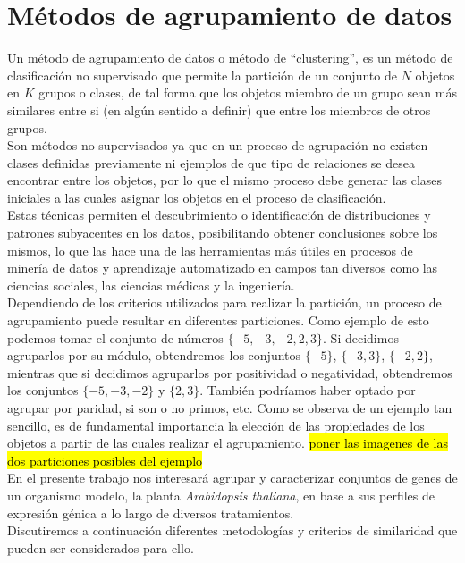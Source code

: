 \chapter{Métodos de agrupamiento de datos}
Un método de agrupamiento de datos o método de ``clustering'', es un método de clasificación no supervisado que permite la partición de un conjunto de $N$ objetos en $K$ grupos o clases, de tal forma que los objetos miembro de un grupo sean más similares entre si (en algún sentido a definir) que entre los miembros de otros grupos.\\
Son métodos no supervisados ya que en un proceso de agrupación no existen clases definidas previamente ni ejemplos de que tipo de relaciones se desea encontrar entre los objetos, por lo que el mismo proceso debe generar las clases iniciales a las cuales asignar los objetos en el proceso de clasificación.\\
Estas técnicas permiten el descubrimiento o identificación de distribuciones y patrones subyacentes en los datos, posibilitando obtener conclusiones sobre los mismos, lo que las hace una de las herramientas más útiles en procesos de minería de datos y aprendizaje automatizado en campos tan diversos como las ciencias sociales, las ciencias médicas y la ingeniería.\\
Dependiendo de los criterios utilizados para realizar la partición, un proceso de agrupamiento puede resultar en diferentes particiones. Como ejemplo de esto podemos tomar el conjunto de números $\{-5, -3, -2, 2, 3\}$. Si decidimos agruparlos por su módulo, obtendremos los conjuntos $\{-5\}$, $\{-3, 3\}$, $\{-2, 2\}$, mientras que si decidimos agruparlos por positividad o negatividad, obtendremos los conjuntos $\{-5, -3, -2\}$ y $\{2, 3\}$. También podríamos haber optado por agrupar por paridad, si son o no primos, etc. Como se observa de un ejemplo tan sencillo, es de fundamental importancia la elección de las propiedades de los objetos a partir de las cuales realizar el agrupamiento.
\hl{poner las imagenes de las dos particiones posibles del ejemplo}\\
En el presente trabajo nos interesará agrupar y caracterizar conjuntos de genes de un organismo modelo, la planta \textit{Arabidopsis thaliana}, en base a sus perfiles de expresión génica a lo largo de diversos tratamientos.\cite{Gan2007, Halkidi2001, Domany1999}\\
Discutiremos a continuación diferentes metodologías y criterios de similaridad que pueden ser considerados para ello.
